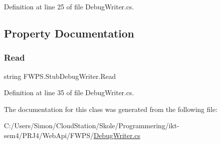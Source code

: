 Definition at line 25 of file Debug\+Writer.\+cs.



\subsection{Property Documentation}
\mbox{\label{class_f_w_p_s_1_1_stub_debug_writer_a3c5817a6047c76052349f43f1832411f}} 
\subsubsection{\texorpdfstring{Read}{Read}}
{\footnotesize\ttfamily string F\+W\+P\+S.\+Stub\+Debug\+Writer.\+Read\hspace{0.3cm}{\ttfamily [get]}}



Definition at line 35 of file Debug\+Writer.\+cs.



The documentation for this class was generated from the following file\+:\begin{DoxyCompactItemize}
\item 
C\+:/\+Users/\+Simon/\+Cloud\+Station/\+Skole/\+Programmering/ikt-\/sem4/\+P\+R\+J4/\+Web\+Api/\+F\+W\+P\+S/\mbox{\hyperlink{_debug_writer_8cs}{Debug\+Writer.\+cs}}\end{DoxyCompactItemize}
